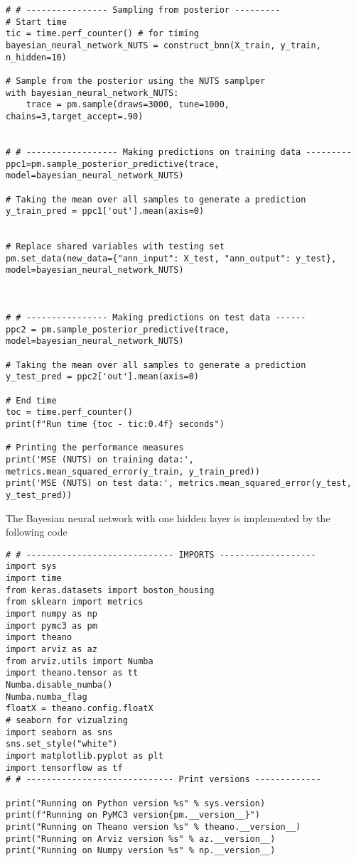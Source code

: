 \begin{appendices}
\begin{lstlisting}
# # ---------------- Sampling from posterior ---------
# Start time
tic = time.perf_counter() # for timing
bayesian_neural_network_NUTS = construct_bnn(X_train, y_train, n_hidden=10)

# Sample from the posterior using the NUTS samplper
with bayesian_neural_network_NUTS:
    trace = pm.sample(draws=3000, tune=1000, chains=3,target_accept=.90)
    

# # ------------------ Making predictions on training data ---------
ppc1=pm.sample_posterior_predictive(trace, model=bayesian_neural_network_NUTS)

# Taking the mean over all samples to generate a prediction
y_train_pred = ppc1['out'].mean(axis=0)


# Replace shared variables with testing set
pm.set_data(new_data={"ann_input": X_test, "ann_output": y_test}, model=bayesian_neural_network_NUTS)



# # ---------------- Making predictions on test data ------
ppc2 = pm.sample_posterior_predictive(trace, model=bayesian_neural_network_NUTS)

# Taking the mean over all samples to generate a prediction
y_test_pred = ppc2['out'].mean(axis=0)

# End time
toc = time.perf_counter()
print(f"Run time {toc - tic:0.4f} seconds")

# Printing the performance measures
print('MSE (NUTS) on training data:', metrics.mean_squared_error(y_train, y_train_pred))
print('MSE (NUTS) on test data:', metrics.mean_squared_error(y_test, y_test_pred))

\end{lstlisting}
The Bayesian neural network with one hidden layer is implemented by the following code
\begin{lstlisting}
# # ----------------------------- IMPORTS -------------------
import sys
import time
from keras.datasets import boston_housing
from sklearn import metrics
import numpy as np 
import pymc3 as pm
import theano
import arviz as az
from arviz.utils import Numba
import theano.tensor as tt
Numba.disable_numba()
Numba.numba_flag
floatX = theano.config.floatX
# seaborn for vizualzing 
import seaborn as sns
sns.set_style("white")
import matplotlib.pyplot as plt
import tensorflow as tf
# # ----------------------------- Print versions -------------

print("Running on Python version %s" % sys.version)
print(f"Running on PyMC3 version{pm.__version__}")
print("Running on Theano version %s" % theano.__version__)
print("Running on Arviz version %s" % az.__version__)
print("Running on Numpy version %s" % np.__version__)


\end{lstlisting}
\end{appendices}
